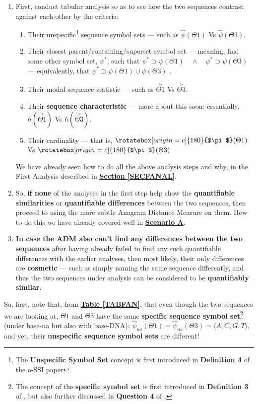 \documentclass[a4paper, 18pt]{book} %
\newcommand{\invpi}{\rotatebox[origin=c]{180}{$\pi$}}
\begin{document}
\begin{enumerate}
\item{First, conduct tabular analysis so as to see how the two sequences contrast against each other by the criteria: 
\begin{enumerate}
\item Their unspecific\footnote{The \textbf{Unspecific Symbol Set} concept is first introduced in \textbf{Definition 4} of the o-SSI paper\cite{ossipaper}} sequence symbol sets --- such as $\hat{\psi}(\Theta1)$ Vs $\hat{\psi}(\Theta3)$.
\item Their closest parent/containing/superset symbol set --- meaning, find some other symbol set, $\psi^*$, such that $\psi^* \supset \psi(\Theta1) \quad \land \quad \psi^* \supset \psi(\Theta3)$ --- equivalently, that $\psi^* \supset \psi(\Theta1) \cup \psi(\Theta3)$ .
\item Their modal sequence statistic --- such as $\overset{>}{\Theta1}$ Vs $\overset{>}{\Theta3}$.
\item Their \textbf{sequence characteristic} --- more about this soon: essentially, $\hbar(\overset{>}{\Theta1})$ Vs $\hbar(\overset{>}{\Theta3})$.
\item Their cardinality --- that is, $\invpi(\Theta1)$ Vs $\invpi(\Theta3)$
\end{enumerate}

We have already seen how to do all the above analysis steps and why, in the First Analysis described in \textbf{\hyperref[SECFANAL]{Section \ref{SECFANAL}}}.
}
\item So, \textbf{if none} of the analyses in the first step help show the \textbf{quantifiable similarities} or \textbf{quantifiable differences} between the two sequences, then proceed to using the more subtle Anagram Distance Measure on them. How to do this we have already covered well in \textbf{\hyperref[SECSCENA]{Scenario A}}.
\item \textbf{In case the ADM also can't find any differences between the two sequences} after having already failed to find any such quantifiable differences with the earlier analyses, then most likely, their only differences are \textbf{cosmetic} --- such as simply naming the same sequence differently, and thus the two sequences under analysis can be considered to be \textbf{quantifiably similar}.
\end{enumerate}

So, first, note that, from \textbf{\hyperref[TABFAN]{Table \ref{TABFAN}}}, that even though the two sequences we are looking at, $\Theta1$ and $\Theta3$ have the same \textbf{specific sequence symbol set}\footnote{The concept of the \textbf{specific symbol set} is first introduced in \textbf{Definition 3} of \cite{ossipaper}, but also further discussed in \textbf{Question 4} of \cite{transformatics_interview}.} (under base-na but also with base-DNA): $\hat{\psi}_{na}(\Theta1) = \hat{\psi}_{na}(\Theta3) = \langle A, C, G, T \rangle$, and yet, their \textbf{unspecific sequence symbol sets} are different! 
\end{document}
